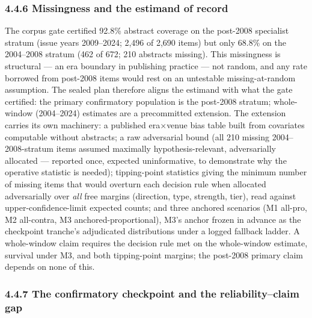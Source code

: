 \subsubsection{4.4.6 Missingness and the estimand of record}\label{missingness-and-the-estimand-of-record}

The corpus gate certified 92.8\% abstract coverage on the post-2008 specialist stratum (issue years 2009--2024; 2,496 of 2,690 items) but only 68.8\% on the 2004--2008 stratum (462 of 672; 210 abstracts missing). This missingness is structural --- an era boundary in publishing practice --- not random, and any rate borrowed from post-2008 items would rest on an untestable missing-at-random assumption. The sealed plan therefore aligns the estimand with what the gate certified: the primary confirmatory population is the post-2008 stratum; whole-window (2004--2024) estimates are a precommitted extension. The extension carries its own machinery: a published era$\times$venue bias table built from covariates computable without abstracts; a raw adversarial bound (all 210 missing 2004--2008-stratum items assumed maximally hypothesis-relevant, adversarially allocated --- reported once, expected uninformative, to demonstrate why the operative statistic is needed); tipping-point statistics giving the minimum number of missing items that would overturn each decision rule when allocated adversarially over \emph{all} free margins (direction, type, strength, tier), read against upper-confidence-limit expected counts; and three anchored scenarios (M1 all-pro, M2 all-contra, M3 anchored-proportional), M3's anchor frozen in advance as the checkpoint tranche's adjudicated distributions under a logged fallback ladder. A whole-window claim requires the decision rule met on the whole-window estimate, survival under M3, and both tipping-point margins; the post-2008 primary claim depends on none of this.

\subsubsection{4.4.7 The confirmatory checkpoint and the reliability--claim gap}\label{the-confirmatory-checkpoint-and-the-reliabilityclaim-gap}

